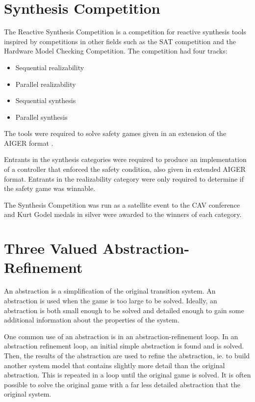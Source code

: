 \section{Synthesis Competition}

The Reactive Synthesis Competition is a competition for reactive synthesis tools inspired by competitions in other fields such as the SAT competition and the Hardware Model Checking Competition. The competition had four tracks:
\begin{itemize}
    \item Sequential realizability
    \item Parallel realizability
    \item Sequential synthesis
    \item Parallel synthesis
\end{itemize}

The tools were required to solve safety games given in an extension of the AIGER format \cite{aiger}. 

Entrants in the synthesis categories were required to produce an implementation of a controller that enforced the safety condition, also given in extended AIGER format. Entrants in the realizability category were only required to determine if the safety game was winnable.

The Synthesis Competition was run as a satellite event to the CAV conference and Kurt Godel medals in silver were awarded to the winners of each category.



\section{Three Valued Abstraction-Refinement}
An abstraction is a simplification of the original transition system. An abstraction is used when the game is too large to be solved. Ideally, an abstraction is both small enough to be solved and detailed enough to gain some additional information about the properties of the system. 

One common use of an abstraction is in an abstraction-refinement loop. In an abstraction refinement loop, an initial simple abstraction is found and is solved. Then, the results of the abstraction are used to refine the abstraction, ie. to build another system model that contains slightly more detail than the original abstraction. This is repeated in a loop until the original game is solved. It is often possible to solve the original game with a far less detailed abstraction that the original system. 

